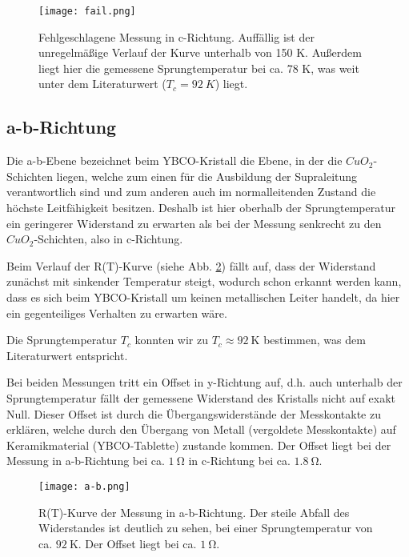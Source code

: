 \begin{figure}[H]
	\begin{center}
		\texttt{[image: fail.png]}
		\caption{Fehlgeschlagene Messung in c-Richtung. Auffällig ist der unregelmäßige Verlauf der Kurve unterhalb von 150 K. Außerdem liegt hier die gemessene Sprungtemperatur bei ca. 78 K, was weit unter dem Literaturwert ($T_{c}=\SI{92}{K}$) liegt. }
		\label{fail}
	\end{center}
\end{figure}


\subsection{a-b-Richtung} %
Die a-b-Ebene bezeichnet beim YBCO-Kristall die Ebene, in der die $CuO_{2}$-Schichten liegen, welche zum einen für die Ausbildung der Supraleitung verantwortlich sind und zum anderen auch im normalleitenden Zustand die höchste Leitfähigkeit besitzen. Deshalb ist hier oberhalb der Sprungtemperatur ein geringerer Widerstand zu erwarten als bei der Messung senkrecht zu den $CuO_{2}$-Schichten, also in c-Richtung.

Beim Verlauf der R(T)-Kurve (siehe Abb. \ref{ab})  fällt auf, dass der Widerstand zunächst mit sinkender Temperatur steigt, wodurch schon erkannt werden kann, dass es sich beim YBCO-Kristall um keinen metallischen Leiter handelt, da hier ein gegenteiliges Verhalten zu erwarten wäre.

Die Sprungtemperatur $T_{c}$ konnten wir zu $T_{c}\approx\SI{92}{\kelvin}$ bestimmen, was dem Literaturwert entspricht. %

Bei beiden Messungen tritt ein Offset in y-Richtung auf, d.h. auch unterhalb der Sprungtemperatur fällt der gemessene Widerstand des Kristalls nicht auf exakt Null. Dieser Offset ist durch die Übergangswiderstände der Messkontakte zu erklären, welche durch den Übergang von Metall (vergoldete Messkontakte) auf Keramikmaterial (YBCO-Tablette) zustande kommen. Der Offset liegt bei der Messung in a-b-Richtung bei ca. $\SI{1}{\ohm}$ in c-Richtung bei ca. $\SI{1,8}{\ohm}$.

\begin{figure}[H]
	\begin{center}
		\texttt{[image: a-b.png]}
		\caption{R(T)-Kurve der Messung in a-b-Richtung. Der steile Abfall des Widerstandes ist deutlich zu sehen, bei einer Sprungtemperatur von ca. $\SI{92}{\kelvin}$. Der Offset liegt bei ca. $\SI{1}{\ohm}$.}
		\label{ab}
	\end{center}
\end{figure}

